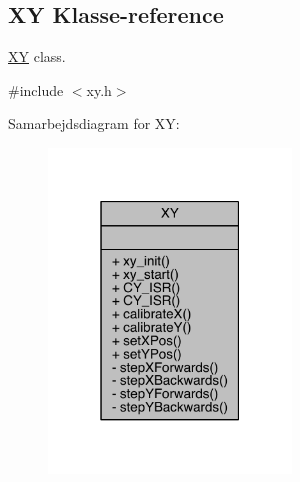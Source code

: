 \hypertarget{class_x_y}{}\subsection{XY Klasse-\/reference}
\label{class_x_y}


\hyperlink{class_x_y}{XY} class.  




{\ttfamily \#include $<$xy.\+h$>$}



Samarbejdsdiagram for XY\+:
\nopagebreak
\begin{figure}[H]
\begin{center}
\leavevmode
\includegraphics[width=183pt]{d5/d40/class_x_y__coll__graph}
\end{center}
\end{figure}
